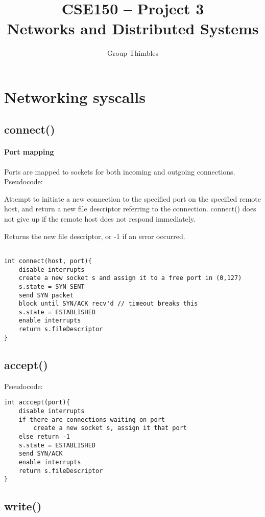 \documentclass[]{article}
\title{CSE150 -- Project 3\\ Networks and Distributed Systems}
\author{Group Thimbles}
\begin{document}
\maketitle


\section{Networking syscalls}
\subsection{connect()}

\paragraph{Port mapping}
Ports are mapped to sockets for both incoming and outgoing connections.\\




\noindent Pseudocode:

 Attempt to initiate a new connection to the specified port on the specified
 remote host, and return a new file descriptor referring to the connection.
 connect() does not give up if the remote host does not respond immediately.
 
 Returns the new file descriptor, or -1 if an error occurred.

\begin{lstlisting}

int connect(host, port){
	disable interrupts
	create a new socket s and assign it to a free port in (0,127)
	s.state = SYN_SENT
	send SYN packet
	block until SYN/ACK recv'd // timeout breaks this
	s.state = ESTABLISHED
	enable interrupts
	return s.fileDescriptor
}
\end{lstlisting}

\subsection{accept()}

Pseudocode:

\begin{lstlisting}
int acccept(port){
	disable interrupts
	if there are connections waiting on port
		create a new socket s, assign it that port
	else return -1
	s.state = ESTABLISHED
	send SYN/ACK
	enable interrupts
	return s.fileDescriptor
}
\end{lstlisting}

\subsection{write()}
\end{document}
